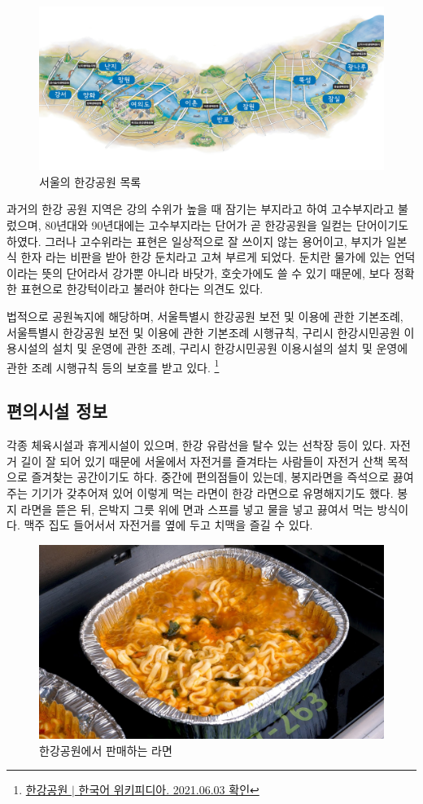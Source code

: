 \begin{figure}[ht]
    \centering
    \includegraphics[width=.6\textwidth]{e_img/hanriver.jpg}
    \caption{서울의 한강공원 목록\protect\footnotemark}
    \label{fig:haryu2}
\end{figure}

과거의 한강 공원 지역은 강의 수위가 높을 때 잠기는 부지라고 하여 고수부지라고 
불렀으며, 80년대와 90년대에는 고수부지라는 단어가 곧 한강공원을 일컫는 단어이기도 
하였다. 그러나 고수위라는 표현은 일상적으로 잘 쓰이지 않는 용어이고, 부지가 일본식 한자
라는 비판을 받아 한강 둔치라고 고쳐 부르게 되었다. 둔치란 물가에 있는 언덕이라는 
뜻의 단어라서 강가뿐 아니라 바닷가, 호숫가에도 쓸 수 있기 때문에, 보다 정확한 표현으로
한강턱이라고 불러야 한다는 의견도 있다.



법적으로 공원녹지에 해당하며, 서울특별시 한강공원 보전 및 이용에 관한 기본조례,
서울특별시 한강공원 보전 및 이용에 관한 기본조례 시행규칙, 구리시 한강시민공원 이용시설의
설치 및 운영에 관한 조례, 구리시 한강시민공원 이용시설의 설치 및 운영에 관한
조례 시행규칙 등의 보호를 받고 있다.
\footnote{\href{https://ko.wikipedia.org/wiki/한강공원}{한강공원 $|$ 한국어 위키피디아. 2021.06.03 확인}}


\subsection{편의시설 정보}
각종 체육시설과 휴게시설이 있으며, 한강 유람선을 탈수 있는 선착장 등이 있다. 자전거
길이 잘 되어 있기 때문에 서울에서 자전거를 즐겨타는 사람들이 자전거 산책 목적으로
즐겨찾는 공간이기도 하다. 중간에 편의점들이 있는데, 봉지라면을 즉석으로 끓여주는
기기가 갖추어져 있어 이렇게 먹는 라면이 한강 라면으로 유명해지기도 했다. 봉지 라면을
뜯은 뒤, 은박지 그릇 위에 면과 스프를 넣고 물을 넣고 끓여서 먹는 방식이다. 맥주 집도 
들어서서 자전거를 옆에 두고 치맥을 즐길 수 있다.

\begin{figure}[ht]
    \centering
    \includegraphics[width=.6\textwidth]{e_img/ww_-003.jpg}
    \caption{한강공원에서 판매하는 라면}
    \label{fig:haryu4}
\end{figure}

